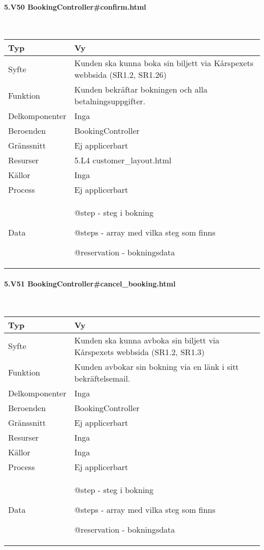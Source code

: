 \documentclass[a4paper, twoside, 11pt, titlepage]{article}
\begin{document}
			\paragraph{5.V50 BookingController\#confirm.html}\

			\begin {table} [ht] \begin{tabular} {  p{3.5cm} p{9.6cm} }
				\hline
				{Typ} & {Vy} \\
				\hline
				{Syfte} & {Kunden ska kunna boka sin biljett via Kårspexets webbsida (SR1.2, SR1.26)} \\
				\hline
				{Funktion} & {Kunden bekräftar bokningen och alla betalningsuppgifter.} \\
				\hline
				{Delkomponenter} & {Inga} \\
				\hline
				{Beroenden} & {BookingController} \\
				\hline
				{Gränssnitt} & {Ej applicerbart} \\
				\hline
				{Resurser} & {5.L4 customer\_layout.html } \\
				\hline
				{Källor} & {Inga} \\
				\hline
				{Process} & {Ej applicerbart} \\
				\hline
				{Data} & {@step - steg i bokning

@steps - array med vilka steg som finns

@reservation - bokningsdata} \\
				\hline
			\end{tabular} \end{table} \FloatBarrier


			\paragraph{5.V51 BookingController\#cancel\_booking.html}\

			\begin {table} [ht] \begin{tabular} {  p{3.5cm} p{9.6cm} }
				\hline
				{Typ} & {Vy} \\
				\hline
				{Syfte} & {Kunden ska kunna avboka sin biljett via Kårspexets webbsida (SR1.2, SR1.3)} \\
				\hline
				{Funktion} & {Kunden avbokar sin bokning via en länk i sitt bekräftelsemail.} \\
				\hline
				{Delkomponenter} & {Inga} \\
				\hline
				{Beroenden} & {BookingController} \\
				\hline
				{Gränssnitt} & {Ej applicerbart} \\
				\hline
				{Resurser} & {Inga} \\
				\hline
				{Källor} & {Inga} \\
				\hline
				{Process} & {Ej applicerbart} \\
				\hline
				{Data} & {@step - steg i bokning

@steps - array med vilka steg som finns

@reservation - bokningsdata} \\
				\hline
			\end{tabular} \end{table} \FloatBarrier
\end{document}
